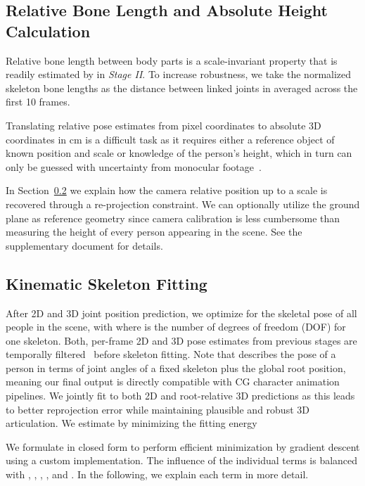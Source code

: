 \documentclass[acmtog,authorversion]{acmart}
\begin{document}
\subsection{Relative Bone Length and Absolute Height Calculation}
Relative bone length between body parts is a scale-invariant property that is readily estimated by  in \textit{Stage II}. To increase robustness, we take the normalized skeleton bone lengths  as the distance between linked joints in  averaged across the first 10 frames.

Translating relative pose estimates from pixel coordinates to absolute 3D coordinates in cm is a difficult task as it requires either a reference object of known position and scale or knowledge of the person's height, which in turn can only be guessed with uncertainty from monocular footage~\cite{gunel2018face}. 

In Section~\ref{sec:kinematics} we explain how the camera relative position up to a scale is recovered through a re-projection constraint. We can optionally utilize the ground plane as reference geometry since camera calibration is less cumbersome than measuring the height of every person appearing in the scene. See the supplementary document for details.



\subsection{Kinematic Skeleton Fitting}
\label{sec:kinematics}

After 2D and 3D joint position prediction, we optimize for the skeletal pose  of all  people in the scene, with  where  is the number of degrees of freedom (DOF) for one skeleton. 
Both, per-frame 2D and 3D pose estimates from previous stages are temporally filtered~\cite{Casiez:2012} before skeleton fitting. Note that  describes the pose of a person in terms of joint angles of a fixed skeleton plus the global root position, meaning our final output is directly compatible with CG character animation pipelines. 
We jointly fit to both 2D and root-relative 3D predictions as this leads to better reprojection error while maintaining plausible and robust 3D articulation.
We estimate  by minimizing the fitting energy

We formulate  in closed form to perform efficient minimization by gradient descent using a custom implementation. The influence of the individual terms is balanced with 
,
,
,
, and
. In the following, we explain each term in more detail.
\end{document}
